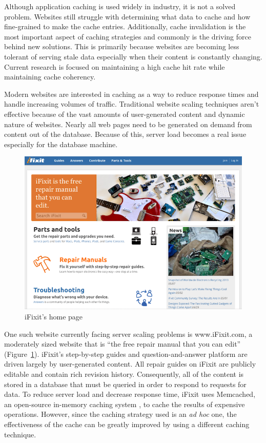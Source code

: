 \documentclass[12pt]{ucthesis}
\begin{document}
Although application caching is used widely in industry, it is not a solved problem.
Websites still struggle with determining what data to cache and how fine-grained to make the cache entries.
Additionally, cache invalidation is the most important aspect of caching strategies and commonly is the driving force behind new solutions.
This is primarily because websites are becoming less tolerant of serving stale data especially when their content is constantly changing.
Current research is focused on maintaining a high cache hit rate while maintaining cache coherency.

Modern websites are interested in caching as a way to reduce response times and handle increasing volumes of traffic.
Traditional website scaling techniques aren't effective because of the vast amounts of user-generated content and dynamic nature of websites.
Nearly all web pages need to be generated on demand from content out of the database.
Because of this, server load becomes a real issue especially for the database machine.

\begin{figure}[h]
\centering
\includegraphics[width=\textwidth]{assets/iFixitHomepage.png}
\caption{iFixit's home page}
\label{fig:iFixitHomePage}
\end{figure}

One such website currently facing server scaling problems is \textsf{www.iFixit.com}, a moderately sized website that is ``the free repair manual that you can edit''\cite{ifixitDotCom} (Figure~\ref{fig:iFixitHomePage}).
\textsf{iFixit}'s step-by-step guides and question-and-answer platform are driven largely by user-generated content.
All repair guides on \textsf{iFixit} are publicly editable and contain rich revision history.
Consequently, all of the content is stored in a database that must be queried in order to respond to requests for data.
To reduce server load and decrease response time, \textsf{iFixit} uses \textsf{Memcached}, an open-source in-memory caching system \cite{memcachedDotOrg}, to cache the results of expensive operations.
However, since the caching strategy used is an \textit{ad hoc} one, the effectiveness of the cache can be greatly improved by using a different caching technique.
\end{document}
